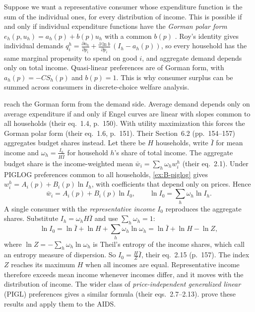 \begin{remark}[Aggregation]\label{rem:B-gorman}
Suppose we want a representative consumer whose expenditure function is the sum of the individual
ones, for every distribution of income. This is possible if and only if individual expenditure functions
have the \emph{Gorman polar form} $e_h(p, u_h) = a_h(p) + b(p)u_h$ with a common $b(p)$
\citep{Gorman1953, Gorman1961}. Roy's identity gives individual demands
$q_i^h = \frac{\partial a_h}{\partial p_i} + \frac{\partial\ln b}{\partial p_i}\,(I_h - a_h(p))$, so every household has the same
marginal propensity to spend on good $i$, and aggregate demand depends only on total income. Quasi-linear
preferences are of Gorman form, with $a_h(p) = -CS_h(p)$ and $b(p) = 1$. This is why consumer surplus can be
summed across consumers in discrete-choice welfare analysis.

\citet[Section~6.1, pp.~149--153]{DeatonMuellbauer1980b} reach the Gorman form from the demand side.
Average demand depends only on average expenditure if and only if Engel curves are linear with slopes
common to all households (their eq.~1.4, p.~150). With utility maximization this forces the Gorman polar
form (their eq.~1.6, p.~151). Their Section~6.2 (pp.~154--157) aggregates budget shares instead. Let there be
$H$ households, write $\bar I$ for mean income and $\omega_h = \frac{I_h}{H\bar I}$ for household $h$'s share of
total income. The aggregate budget share is the income-weighted mean $\bar w_i = \sum_h\omega_hw_i^h$ (their
eq.~2.1). Under PIGLOG preferences common to all households, \cref{ex:B-piglog} gives
$w_i^h = A_i(p) + B_i(p)\ln I_h$, with coefficients that depend only on prices. Hence
\begin{equation*}
\bar w_i = A_i(p) + B_i(p)\ln I_0, \qquad \ln I_0 = \sum_h\omega_h\ln I_h .
\end{equation*}
A single consumer with the \emph{representative income} $I_0$ reproduces the aggregate shares. Substitute
$I_h = \omega_hH\bar I$ and use $\sum_h\omega_h = 1$:
\begin{equation*}
\ln I_0 = \ln\bar I + \ln H + \sum_h\omega_h\ln\omega_h = \ln\bar I + \ln H - \ln Z,
\end{equation*}
where $\ln Z = -\sum_h\omega_h\ln\omega_h$ is Theil's entropy of the income shares, which
\citet[p.~157]{DeatonMuellbauer1980b} call an entropy measure of dispersion. So $I_0 = \frac{H}{Z}\bar I$,
their eq.~2.15 (p.~157). The index $Z$ reaches its maximum $H$ when all incomes are equal. Representative
income therefore exceeds mean income whenever incomes differ, and it moves with the distribution of income.
The wider class of \emph{price-independent generalized linear} (PIGL) preferences gives a similar formula
(their eqs.~2.7--2.13).  prove
these results and apply them to the AIDS.
\end{remark}

